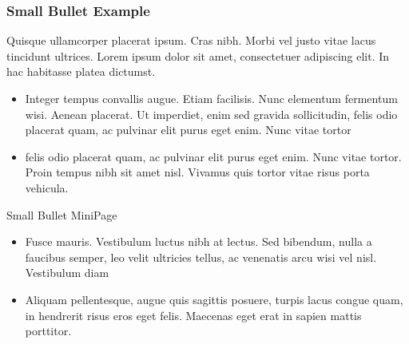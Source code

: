 \documentclass[xcolor=dvipsnames]{beamer} %
\begin{document}
\begin{frame}
\frametitle{Small Bullet Example}
Quisque ullamcorper placerat ipsum. Cras nibh. Morbi vel justo vitae lacus
tincidunt ultrices. Lorem ipsum dolor sit amet, consectetuer adipiscing elit.
In hac habitasse platea dictumst.
    
\begin{minipage}{.5\textwidth}
\small
\begin{itemize}
    \item  Integer tempus convallis augue. Etiam
facilisis. Nunc elementum fermentum wisi. Aenean placerat. Ut imperdiet,
enim sed gravida sollicitudin, felis odio placerat quam, ac pulvinar elit
purus eget enim. Nunc vitae tortor
    \item felis odio placerat quam, ac pulvinar elit
purus eget enim. Nunc vitae tortor. Proin tempus nibh sit amet nisl.
Vivamus quis tortor vitae risus porta vehicula.
\end{itemize}
\end{minipage}%
\begin{minipage}{.5\textwidth}
    \begin{center}
    \end{center}
\end{minipage}

\end{frame}

\begin{frame}{Small Bullet MiniPage}

\begin{minipage}[t]{.5\textwidth}
    \small
    \begin{itemize}
        \item Fusce mauris. Vestibulum luctus
                nibh at lectus. Sed bibendum, nulla
                a faucibus semper, leo velit ultricies
                tellus, ac venenatis arcu wisi vel
                nisl. Vestibulum diam
       \item Aliquam
            pellentesque, augue quis sagittis
            posuere, turpis lacus congue quam,
            in hendrerit risus eros eget felis.
            Maecenas eget erat in sapien
            mattis porttitor. 
    \end{itemize}  
\end{minipage}%
\begin{minipage}[t]{.5\textwidth}
    \begin{center}
    \end{center}
\end{minipage}
  
\end{frame}
\end{document}

